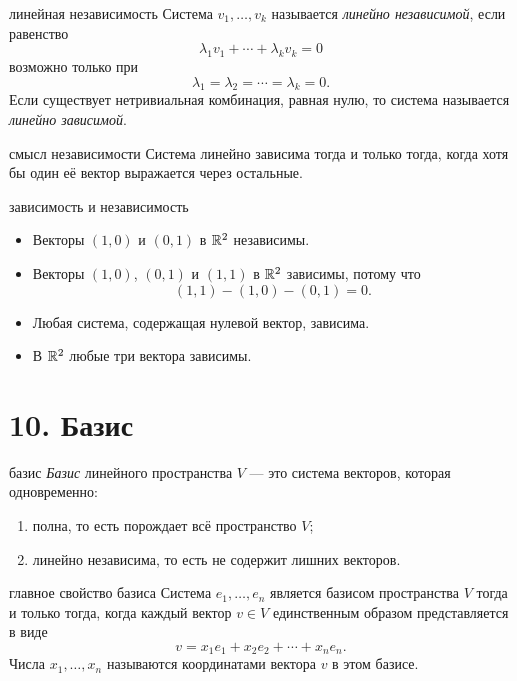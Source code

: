\begin{defbox}{линейная независимость}
Система $v_1,\ldots,v_k$ называется \emph{линейно независимой}, если равенство
\[
    \lambda_1v_1+\cdots+\lambda_kv_k=0
\]
возможно только при
\[
    \lambda_1=\lambda_2=\cdots=\lambda_k=0.
\]
Если существует нетривиальная комбинация, равная нулю, то система называется \emph{линейно зависимой}.
\end{defbox}


\begin{factbox}{смысл независимости}
Система линейно зависима тогда и только тогда, когда хотя бы один её вектор выражается через остальные.
\end{factbox}

\begin{examplebox}{зависимость и независимость}
\begin{itemize}
    \item Векторы $(1,0)$ и $(0,1)$ в $\mathbb{R}^2$ независимы.
    \item Векторы $(1,0)$, $(0,1)$ и $(1,1)$ в $\mathbb{R}^2$ зависимы, потому что
    \[
        (1,1)-(1,0)-(0,1)=0.
    \]
    \item Любая система, содержащая нулевой вектор, зависима.
    \item В $\mathbb{R}^2$ любые три вектора зависимы.
\end{itemize}
\end{examplebox}

\section*{10. Базис}

\begin{defbox}{базис}
\emph{Базис} линейного пространства $V$ --- это система векторов, которая одновременно:
\begin{enumerate}
    \item полна, то есть порождает всё пространство $V$;
    \item линейно независима, то есть не содержит лишних векторов.
\end{enumerate}
\end{defbox}

\begin{factbox}{главное свойство базиса}
Система $e_1,\ldots,e_n$ является базисом пространства $V$ тогда и только тогда, когда каждый вектор $v\in V$ единственным образом представляется в виде
\[
    v=x_1e_1+x_2e_2+\cdots+x_ne_n.
\]
Числа $x_1,\ldots,x_n$ называются координатами вектора $v$ в этом базисе.
\end{factbox}

